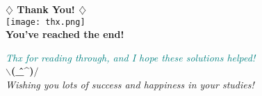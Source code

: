 \documentclass[12pt]{article}
\begin{document}
\pagebreak

\begin{tcolorbox}[colframe=purple!70!red, colback=white, sharp corners=southwest, boxrule=2mm]
    \begin{center}
        \textbf{\huge \textcolor{purple!70!red}{\(\diamondsuit\) Thank You! \(\diamondsuit\)}}\\[1em]
        \texttt{[image: thx.png]} \\
        \vspace{1em}
        \textbf{\LARGE You've reached the end!}
    \end{center}

    \vspace{1.5em}

    \begin{center}
        \textcolor{teal}{\textit{Thx for reading through, and I hope these solutions helped!}}\\[0.5em]
        \textbf{\Huge $\backslash$(\^\_\^{})$/$} \\
        \vspace{1em}
        \textit{Wishing you lots of success and happiness in your studies!}
    \end{center}

    \vspace{2em}
\end{tcolorbox}
\end{document}

